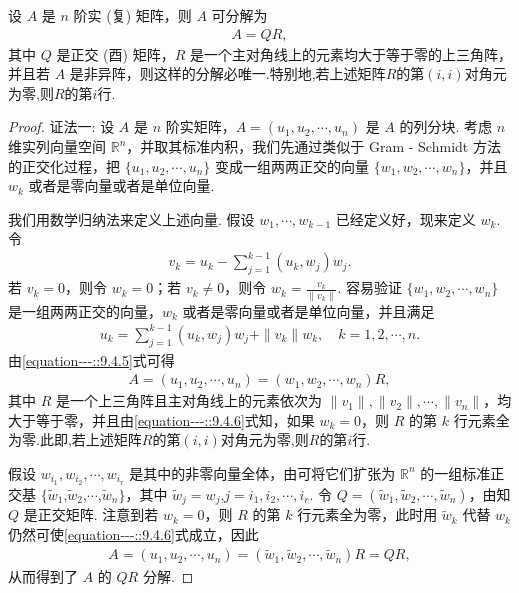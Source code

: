 \documentclass[../../main.tex]{subfiles}
\begin{document}
\begin{theorem}[矩阵的QR分解]\label{theorem:矩阵的QR分解}
设 $A$ 是 $n$ 阶实 (复) 矩阵，则 $A$ 可分解为
\begin{align*}
A = QR,
\end{align*}
其中 $Q$ 是正交 (酉) 矩阵，$R$ 是一个主对角线上的元素均大于等于零的上三角阵，并且若 $A$ 是非异阵，则这样的分解必唯一.特别地,若上述矩阵$R$的第$(i,i)$对角元为零,则$R$的第$i$行.
\end{theorem}
\begin{proof}
{\color{blue}证法一:}
设 $A$ 是 $n$ 阶实矩阵，$A = (u_1,u_2,\cdots,u_n)$ 是 $A$ 的列分块. 考虑 $n$ 维实列向量空间 $\mathbb{R}^n$，并取其标准内积，我们先通过类似于 Gram - Schmidt 方法的正交化过程，把 $\{u_1,u_2,\cdots,u_n\}$ 变成一组两两正交的向量 $\{w_1,w_2,\cdots,w_n\}$，并且 $w_k$ 或者是零向量或者是单位向量.

我们用数学归纳法来定义上述向量. 假设 $w_1,\cdots,w_{k - 1}$ 已经定义好，现来定义 $w_k$. 令
\begin{align*}
v_k = u_k - \sum_{j = 1}^{k - 1}(u_k,w_j)w_j.
\end{align*}
若 $v_k = 0$，则令 $w_k = 0$；若 $v_k \neq 0$，则令 $w_k = \frac{v_k}{\|v_k\|}$. 容易验证 $\{w_1,w_2,\cdots,w_n\}$ 是一组两两正交的向量，$w_k$ 或者是零向量或者是单位向量，并且满足
\begin{align}
u_k = \sum_{j = 1}^{k - 1}(u_k,w_j)w_j + \|v_k\|w_k,\quad k = 1,2,\cdots,n.\label{equation---::9.4.5}
\end{align}
由\eqref{equation---::9.4.5}式可得
\begin{align}
A = (u_1,u_2,\cdots,u_n) = (w_1,w_2,\cdots,w_n)R,\label{equation---::9.4.6}
\end{align}
其中 $R$ 是一个上三角阵且主对角线上的元素依次为 $\|v_1\|,\|v_2\|,\cdots,\|v_n\|$，均大于等于零，并且由\eqref{equation---::9.4.6}式知，如果 $w_k = 0$，则 $R$ 的第 $k$ 行元素全为零.此即,若上述矩阵$R$的第$(i,i)$对角元为零,则$R$的第$i$行.

假设 $w_{i_1},w_{i_2},\cdots,w_{i_r}$ 是其中的非零向量全体，由可将它们扩张为 $\mathbb{R}^n$ 的一组标准正交基 $\{\widetilde{w}_1$,$\widetilde{w}_2$,$\cdots$,$\widetilde{w}_n\}$，其中 $\widetilde{w}_j = w_j$,$j = i_1,i_2,\cdots,i_r$. 令 $Q = (\widetilde{w}_1,\widetilde{w}_2,\cdots,\widetilde{w}_n)$，由知 $Q$ 是正交矩阵. 注意到若 $w_k = 0$，则 $R$ 的第 $k$ 行元素全为零，此时用 $\widetilde{w}_k$ 代替 $w_k$ 仍然可使\eqref{equation---::9.4.6}式成立，因此
\begin{align*}
A = (u_1,u_2,\cdots,u_n) = (\widetilde{w}_1,\widetilde{w}_2,\cdots,\widetilde{w}_n)R = QR,
\end{align*}
从而得到了 $A$ 的 $QR$ 分解.


\end{proof}
\end{document}
